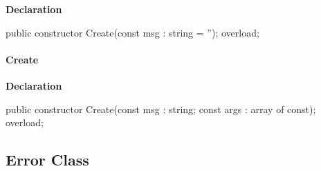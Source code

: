 \documentclass{report}
\newif\ifpdf
\begin{document}
\label{NewPascal.Base.Excptn-Create}
\begin{list}{}{
\setlength{\itemindent}{0cm}
\setlength{\listparindent}{0cm}
\setlength{\leftmargin}{\evensidemargin}
\addtolength{\leftmargin}{\tmplength}
\settowidth{\labelsep}{X}
\addtolength{\leftmargin}{\labelsep}
\setlength{\labelwidth}{\tmplength}
}
\item[\textbf{Declaration}\hfill]
\ifpdf
\begin{flushleft}
\fi
\begin{ttfamily}
public constructor Create(const msg : string = ''); overload;\end{ttfamily}

\ifpdf
\end{flushleft}
\fi

\end{list}
\paragraph*{Create}\hspace*{\fill}

\label{NewPascal.Base.Excptn-Create}
\begin{list}{}{
\setlength{\itemindent}{0cm}
\setlength{\listparindent}{0cm}
\setlength{\leftmargin}{\evensidemargin}
\addtolength{\leftmargin}{\tmplength}
\settowidth{\labelsep}{X}
\addtolength{\leftmargin}{\labelsep}
\setlength{\labelwidth}{\tmplength}
}
\item[\textbf{Declaration}\hfill]
\ifpdf
\begin{flushleft}
\fi
\begin{ttfamily}
public constructor Create(const msg : string; const args : array of const); overload;\end{ttfamily}

\ifpdf
\end{flushleft}
\fi

\end{list}
\ifpdf
\subsection*{\large{\textbf{Error Class}}\normalsize\hspace{1ex}\hrulefill}
\else
\subsection*{Error Class}
\fi
\label{NewPascal.Base.Error}
\end{document}
